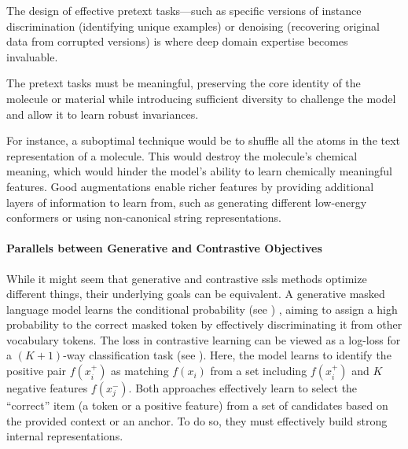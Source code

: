 The design of effective pretext tasks---such as specific versions of instance discrimination (identifying unique examples) or denoising (recovering original data from corrupted versions) is where deep domain expertise becomes invaluable.

The pretext tasks must be meaningful, preserving the core identity of the molecule or material while introducing sufficient diversity to challenge the model and allow it to learn robust invariances.

For instance, a suboptimal technique would be to shuffle all the atoms in the text representation of a molecule. 
This would destroy the molecule's chemical meaning, which would hinder the model's ability to learn chemically meaningful features. 
Good augmentations enable richer features by providing additional layers of information to learn from, such as generating different low-energy conformers or using non-canonical string representations.


\paragraph{Parallels between Generative and Contrastive Objectives}

While it might seem that generative and contrastive \glspl{ssl} methods optimize different things, their underlying goals can be equivalent. 
A generative masked language model learns the conditional probability
(see )
, aiming to assign a high probability to the correct masked token by effectively discriminating it from other vocabulary tokens. 
The  loss in contrastive learning can be viewed as a log-loss for a $(K+1)$-way classification task (see ). 
Here, the model learns to identify the positive pair $f(x_i^+)$ as matching $f(x_i)$ from a set including $f(x_i^+)$ and $K$ negative features $f(x_j^-)$. 
Both approaches effectively learn to select the \enquote{correct} item (a token or a positive feature) from a set of candidates based on the provided context or an anchor. 
To do so, they must effectively build strong internal representations.




